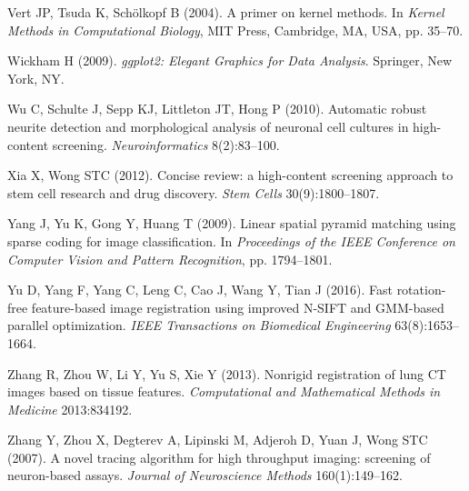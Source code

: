 \begin{thebibliography}{110}
Vert JP, Tsuda K, Sch{\"o}lkopf B (2004).
\newblock A primer on kernel methods. In \emph{Kernel Methods in Computational
  Biology}, MIT Press, Cambridge, MA, USA, pp. 35--70.

Wickham H (2009). \emph{ggplot2: Elegant Graphics for Data Analysis}. Springer,
  New York, NY.

Wu C, Schulte J, Sepp KJ, Littleton JT, Hong P (2010). Automatic robust neurite
  detection and morphological analysis of neuronal cell cultures in
  high-content screening. \emph{Neuroinformatics} 8(2):83--100.

Xia X, Wong STC (2012). Concise review: a high-content screening approach to
  stem cell research and drug discovery. \emph{Stem Cells} 30(9):1800--1807.

Yang J, Yu K, Gong Y, Huang T (2009). Linear spatial pyramid matching using
  sparse coding for image classification. In \emph{Proceedings of the IEEE
  Conference on Computer Vision and Pattern Recognition}, pp. 1794--1801.

Yu D, Yang F, Yang C, Leng C, Cao J, Wang Y, Tian J (2016). Fast rotation-free
  feature-based image registration using improved {N-SIFT} and {GMM}-based
  parallel optimization. \emph{IEEE Transactions on Biomedical Engineering}
  63(8):1653--1664.

Zhang R, Zhou W, Li Y, Yu S, Xie Y (2013). Nonrigid registration of lung {CT}
  images based on tissue features. \emph{Computational and Mathematical Methods
  in Medicine} 2013:834192.

Zhang Y, Zhou X, Degterev A, Lipinski M, Adjeroh D, Yuan J, Wong STC (2007). A
  novel tracing algorithm for high throughput imaging: screening of
  neuron-based assays. \emph{Journal of Neuroscience Methods} 160(1):149--162.

\end{thebibliography}


